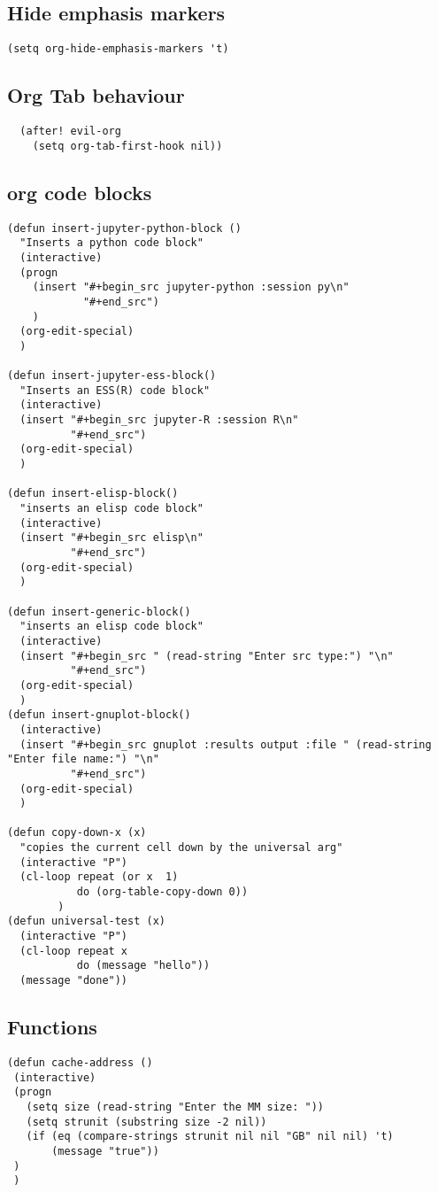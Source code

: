 \documentclass[11pt]{article}
\begin{document}
\subsection{Hide emphasis markers}
\label{sec:org7aaa70a}
\begin{verbatim}
(setq org-hide-emphasis-markers 't)
\end{verbatim}
\subsection{Org Tab behaviour}
\label{sec:orgefaacf4}
\begin{verbatim}
  (after! evil-org
    (setq org-tab-first-hook nil))
\end{verbatim}
\subsection{org code blocks}
\label{sec:orgef104a2}
\begin{verbatim}
(defun insert-jupyter-python-block ()
  "Inserts a python code block"
  (interactive)
  (progn
    (insert "#+begin_src jupyter-python :session py\n"
            "#+end_src")
    )
  (org-edit-special)
  )

(defun insert-jupyter-ess-block()
  "Inserts an ESS(R) code block"
  (interactive)
  (insert "#+begin_src jupyter-R :session R\n"
          "#+end_src")
  (org-edit-special)
  )

(defun insert-elisp-block()
  "inserts an elisp code block"
  (interactive)
  (insert "#+begin_src elisp\n"
          "#+end_src")
  (org-edit-special)
  )

(defun insert-generic-block()
  "inserts an elisp code block"
  (interactive)
  (insert "#+begin_src " (read-string "Enter src type:") "\n"
          "#+end_src")
  (org-edit-special)
  )
(defun insert-gnuplot-block()
  (interactive)
  (insert "#+begin_src gnuplot :results output :file " (read-string "Enter file name:") "\n"
          "#+end_src")
  (org-edit-special)
  )

(defun copy-down-x (x)
  "copies the current cell down by the universal arg"
  (interactive "P")
  (cl-loop repeat (or x  1)
           do (org-table-copy-down 0))
        )
(defun universal-test (x)
  (interactive "P")
  (cl-loop repeat x
           do (message "hello"))
  (message "done"))
\end{verbatim}

\subsection{Functions}
\label{sec:orgfb9da56}
\begin{verbatim}
(defun cache-address ()
 (interactive)
 (progn
   (setq size (read-string "Enter the MM size: "))
   (setq strunit (substring size -2 nil))
   (if (eq (compare-strings strunit nil nil "GB" nil nil) 't)
       (message "true"))
 )
 )
\end{verbatim}
\end{document}
